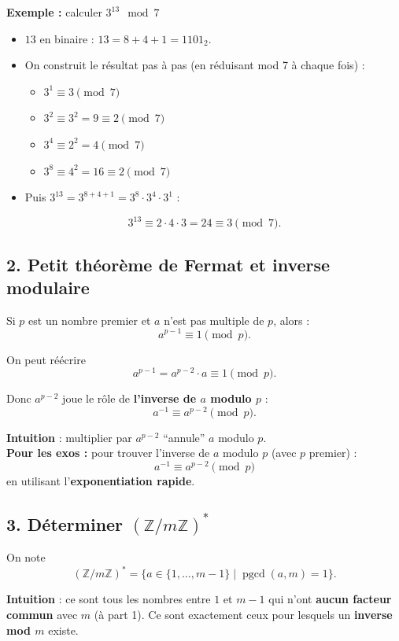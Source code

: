 \textbf{Exemple : } calculer $3^{13} \mod 7$
\begin{itemize}
    \item $13$ en binaire : $13 = 8 + 4 + 1 = 1101_2$.
    \item On construit le résultat pas à pas (en réduisant mod 7 à chaque fois) :
    \begin{itemize}
        \item $3^1 \equiv 3 \pmod{7}$
        \item $3^2 \equiv 3^2 = 9 \equiv 2 \pmod{7}$
        \item $3^4 \equiv 2^2 = 4 \pmod{7}$
        \item $3^8 \equiv 4^2 = 16 \equiv 2 \pmod{7}$
    \end{itemize}
    \item Puis $3^{13} = 3^{8+4+1} = 3^8 \cdot 3^4 \cdot 3^1$ :
\end{itemize}
\[
3^{13} \equiv 2 \cdot 4 \cdot 3 = 24 \equiv 3 \pmod{7}.
\]


\subsection*{2. Petit théorème de Fermat et inverse modulaire}

Si $p$ est un nombre premier et $a$ n’est pas multiple de $p$, alors :
\[
a^{p-1} \equiv 1 \pmod{p}.
\]

On peut réécrire
\[
a^{p-1} = a^{p-2} \cdot a \equiv 1 \pmod{p}.
\]

Donc $a^{p-2}$ joue le rôle de \textbf{l’inverse de $a$ modulo $p$} :
\[
a^{-1} \equiv a^{p-2} \pmod{p}.
\]

\textbf{Intuition} : multiplier par $a^{p-2}$ “annule” $a$ modulo $p$. \\

\textbf{Pour les exos :} pour trouver l’inverse de $a$ modulo $p$ (avec $p$ premier) :
\[
a^{-1} \equiv a^{p-2} \pmod{p}
\]
en utilisant l’\textbf{exponentiation rapide}. \\


\subsection*{3. Déterminer \( (\mathbb{Z}/m\mathbb{Z})^* \)}

On note
\[
(\mathbb{Z}/m\mathbb{Z})^* = \{ a \in \{1, \dots, m-1\} \mid \operatorname{pgcd}(a,m)=1 \}.
\]

\textbf{Intuition} : ce sont tous les nombres entre $1$ et $m-1$ qui n’ont \textbf{aucun facteur commun} avec $m$ (à part 1). Ce sont exactement ceux pour lesquels un \textbf{inverse mod $m$} existe. \\

